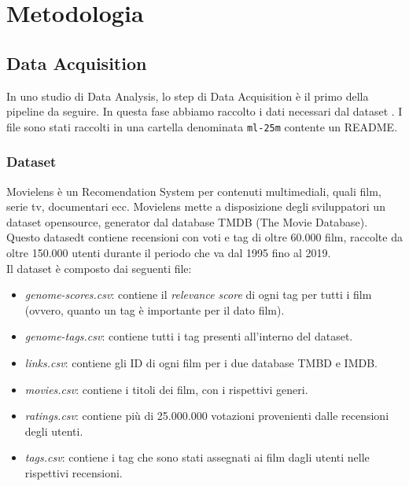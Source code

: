 \documentclass[../../Report.tex]{subfiles}
\begin{document}
\chapter{Metodologia}

\section{Data Acquisition}
In uno studio di Data Analysis, lo step di Data Acquisition è il primo della pipeline da seguire.
In questa fase abbiamo raccolto i dati necessari dal dataset \cite[MovieLens]{movielens}.
I file sono stati raccolti in una cartella denominata \texttt{ml-25m} contente un README.


\subsection*{Dataset}
\label{dataset}

Movielens è un Recomendation System per contenuti multimediali, quali film, serie tv, documentari ecc.
Movielens mette a disposizione degli sviluppatori un dataset opensource, generator dal database TMDB (The Movie Database).
Questo datasedt contiene recensioni con voti e tag di oltre 60.000 film, raccolte da oltre 150.000 utenti durante il periodo che va dal 1995 fino al 2019.
\\
Il dataset è composto dai seguenti file:
\begin{itemize}
    \item \textit{genome-scores.csv}: contiene il \textit{relevance score} di ogni tag per tutti i film (ovvero, quanto un tag è importante per il dato film).
    \item \textit{genome-tags.csv}: contiene tutti i tag presenti all'interno del dataset.
    \item \textit{links.csv}: contiene gli ID di ogni film per i due database TMBD e IMDB.
    \item \textit{movies.csv}: contiene i titoli dei film, con i rispettivi generi.
    \item \textit{ratings.csv}: contiene più di 25.000.000 votazioni provenienti dalle recensioni degli utenti.
    \item \textit{tags.csv}: contiene i tag che sono stati assegnati ai film dagli utenti nelle rispettivi recensioni.
\end{itemize}
\end{document}
